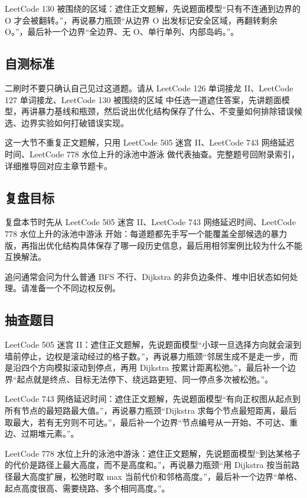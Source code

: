 LeetCode 130 被围绕的区域：遮住正文题解，先说题面模型“只有不连通到边界的 O 才会被翻转。”，再说暴力瓶颈“从边界 O 出发标记安全区域，再翻转剩余 O。”，最后补一个边界“全边界、无 O、单行单列、内部岛屿。”。

\subsection{自测标准}

二刷时不要只确认自己见过这道题。请从 LeetCode 126 单词接龙 II、LeetCode 127 单词接龙、LeetCode 130 被围绕的区域 中任选一道遮住答案，先讲题面模型，再讲暴力基线和瓶颈，然后说出优化结构保存了什么、不变量如何排除错误候选、边界实验如何打破错误实现。

这一大节不重复正文题解，只用 LeetCode 505 迷宫 II、LeetCode 743 网络延迟时间、LeetCode 778 水位上升的泳池中游泳 做代表抽查。完整题号回附录索引，详细推导回对应主章节题卡。

\subsection{复盘目标}

复盘本节时先从 LeetCode 505 迷宫 II、LeetCode 743 网络延迟时间、LeetCode 778 水位上升的泳池中游泳 开始：每道题都先手写一个能覆盖全部候选的暴力版，再指出优化结构具体保存了哪一段历史信息，最后用相邻案例比较为什么不能互换解法。

追问通常会问为什么普通 BFS 不行、Dijkstra 的非负边条件、堆中旧状态如何处理。请准备一个不同边权反例。

\subsection{抽查题目}

LeetCode 505 迷宫 II：遮住正文题解，先说题面模型“小球一旦选择方向就会滚到墙前停止，边权是滚动经过的格子数。”，再说暴力瓶颈“邻居生成不是走一步，而是沿四个方向模拟滚动到停点，再用 Dijkstra 按累计距离松弛。”，最后补一个边界“起点就是终点、目标无法停下、绕远路更短、同一停点多次被松弛。”。

LeetCode 743 网络延迟时间：遮住正文题解，先说题面模型“有向正权图从起点到所有节点的最短路最大值。”，再说暴力瓶颈“Dijkstra 求每个节点最短距离，最后取最大，若有无穷则不可达。”，最后补一个边界“节点编号从一开始、不可达、重边、过期堆元素。”。

LeetCode 778 水位上升的泳池中游泳：遮住正文题解，先说题面模型“到达某格子的代价是路径上最大高度，而不是高度和。”，再说暴力瓶颈“用 Dijkstra 按当前路径最大高度扩展，松弛时取 max 当前代价和邻格高度。”，最后补一个边界“单格、起点高度很高、需要绕路、多个相同高度。”。

